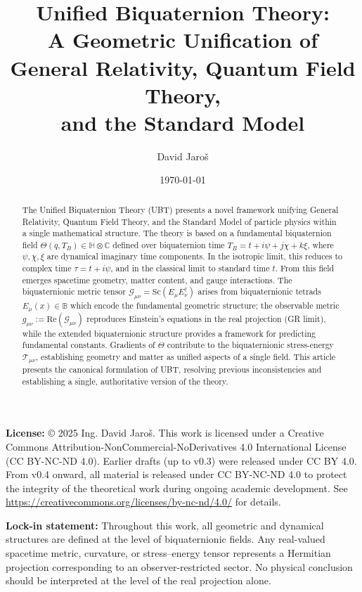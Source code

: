 \documentclass[12pt,a4paper]{article}
\title{Unified Biquaternion Theory:\\
A Geometric Unification of General Relativity, Quantum Field Theory,\\
and the Standard Model}
\author{David Jaroš}
\date{\today}
\begin{document}
\maketitle

\noindent
\textbf{License:} © 2025 Ing. David Jaroš. This work is licensed under a Creative Commons Attribution-NonCommercial-NoDerivatives 4.0 International License (CC BY-NC-ND 4.0). Earlier drafts (up to v0.3) were released under CC BY 4.0. From v0.4 onward, all material is released under CC BY-NC-ND 4.0 to protect the integrity of the theoretical work during ongoing academic development. See \url{https://creativecommons.org/licenses/by-nc-nd/4.0/} for details.

\vspace{1em}

\begin{abstract}
The Unified Biquaternion Theory (UBT) presents a novel framework unifying General Relativity, Quantum Field Theory, and the Standard Model of particle physics within a single mathematical structure. The theory is based on a fundamental biquaternion field $\Theta(q,T_B) \in \mathbb{H} \otimes \mathbb{C}$ defined over biquaternion time $T_B = t + i\psi + j\chi + k\xi$, where $\psi, \chi, \xi$ are dynamical imaginary time components. In the isotropic limit, this reduces to complex time $\tau = t + i\psi$, and in the classical limit to standard time $t$. From this field emerges spacetime geometry, matter content, and gauge interactions. The biquaternionic metric tensor $\mathcal{G}_{\mu\nu} = \text{Sc}(E_\mu E_\nu^\dagger)$ arises from biquaternionic tetrads $E_\mu(x) \in \mathbb{B}$ which encode the fundamental geometric structure; the observable metric $g_{\mu\nu} := \text{Re}(\mathcal{G}_{\mu\nu})$ reproduces Einstein's equations in the real projection (GR limit), while the extended biquaternionic structure provides a framework for predicting fundamental constants. Gradients of $\Theta$ contribute to the biquaternionic stress-energy $\mathcal{T}_{\mu\nu}$, establishing geometry and matter as unified aspects of a single field. This article presents the canonical formulation of UBT, resolving previous inconsistencies and establishing a single, authoritative version of the theory.
\end{abstract}

\noindent\textbf{Lock-in statement:} Throughout this work, all geometric and dynamical structures are defined at the level of biquaternionic fields. Any real-valued spacetime metric, curvature, or stress--energy tensor represents a Hermitian projection corresponding to an observer-restricted sector. No physical conclusion should be interpreted at the level of the real projection alone.
\end{document}
